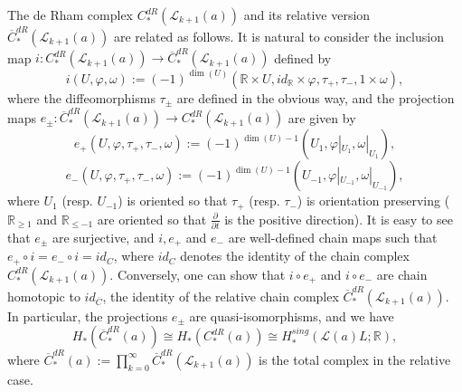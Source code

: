 \documentclass[a4paper]{article}
\numberwithin{equation}{section}
\begin{document}
The de Rham complex $C_\ast^\mathit{dR}(\mathcal{L}_{k+1}(a))$ and its relative version $\overline{C}_\ast^\mathit{dR}(\mathcal{L}_{k+1}(a))$ are related as follows. It is natural to consider the inclusion map $i:C_\ast^\mathit{dR}(\mathcal{L}_{k+1}(a))\rightarrow\overline{C}_\ast^\mathit{dR}(\mathcal{L}_{k+1}(a))$ defined by
\begin{equation}\label{eq:i}
i(U,\varphi,\omega):=(-1)^{\dim(U)}(\mathbb{R}\times U,\mathit{id}_\mathbb{R}\times\varphi,\tau_+,\tau_-,1\times\omega),
\end{equation}
where the diffeomorphisms $\tau_\pm$ are defined in the obvious way, and the projection maps $e_\pm:\overline{C}_\ast^\mathit{dR}(\mathcal{L}_{k+1}(a))\rightarrow C_\ast^\mathit{dR}(\mathcal{L}_{k+1}(a))$ are given by
\begin{equation}\label{eq:e+}
e_+(U,\varphi,\tau_+,\tau_-,\omega):=(-1)^{\dim(U)-1}(U_1,\varphi|_{U_1},\omega|_{U_1}),
\end{equation}
\begin{equation}\label{eq:e-}
e_-(U,\varphi,\tau_+,\tau_-,\omega):=(-1)^{\dim(U)-1}(U_{-1},\varphi|_{U_{-1}},\omega|_{U_{-1}}),
\end{equation}
where $U_1$ (resp. $U_{-1}$) is oriented so that $\tau_+$ (resp. $\tau_-$) is orientation preserving ($\mathbb{R}_{\geq1}$ and $\mathbb{R}_{\leq-1}$ are oriented so that $\frac{\partial}{\partial t}$ is the positive direction). It is easy to see that $e_\pm$ are surjective, and $i,e_+$ and $e_-$ are well-defined chain maps such that $e_+\circ i=e_-\circ i=\mathit{id}_C$, where $\mathit{id}_C$ denotes the identity of the chain complex $C_\ast^\mathit{dR}(\mathcal{L}_{k+1}(a))$. Conversely, one can show that $i\circ e_+$ and $i\circ e_-$ are chain homotopic to $\mathit{id}_{\overline{C}}$, the identity of the relative chain complex $\overline{C}_\ast^\mathit{dR}(\mathcal{L}_{k+1}(a))$. In particular, the projections $e_\pm$ are quasi-isomorphisms, and we have
\begin{equation} 
H_\ast\left(\overline{C}_\ast^\mathit{dR}(a)\right)\cong H_\ast\left(C_\ast^\mathit{dR}(a)\right)\cong H_\ast^\mathit{sing}(\mathcal{L}(a)L;\mathbb{R}),
\end{equation}
where $\overline{C}_\ast^\mathit{dR}(a):=\prod_{k=0}^\infty\overline{C}_\ast^\mathit{dR}\left(\mathcal{L}_{k+1}(a)\right)$ is the total complex in the relative case.
\end{document}
